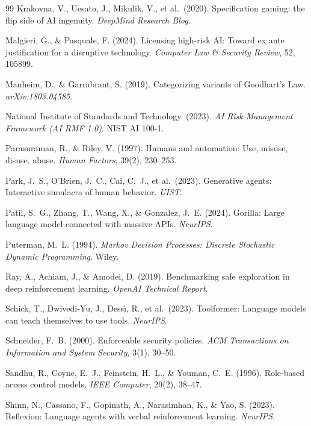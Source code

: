 \documentclass[11pt,a4paper]{article}
\theoremstyle{remark}
\begin{document}
\begin{thebibliography}{99}
Krakovna, V., Uesato, J., Mikulik, V., et al.\ (2020). Specification gaming: the flip side of AI ingenuity. \textit{DeepMind Research Blog}.

Malgieri, G., \& Pasquale, F. (2024). Licensing high-risk AI: Toward ex ante justification for a disruptive technology. \textit{Computer Law \& Security Review}, 52, 105899.

Manheim, D., \& Garrabrant, S. (2019). Categorizing variants of Goodhart's Law. \textit{arXiv:1803.04585}.

National Institute of Standards and Technology. (2023). \textit{AI Risk Management Framework (AI RMF 1.0)}. NIST AI 100-1.

Parasuraman, R., \& Riley, V. (1997). Humans and automation: Use, misuse, disuse, abuse. \textit{Human Factors}, 39(2), 230--253.

Park, J.~S., O'Brien, J.~C., Cai, C.~J., et al.\ (2023). Generative agents: Interactive simulacra of human behavior. \textit{UIST}.

Patil, S.~G., Zhang, T., Wang, X., \& Gonzalez, J.~E. (2024). Gorilla: Large language model connected with massive APIs. \textit{NeurIPS}.

Puterman, M.~L. (1994). \textit{Markov Decision Processes: Discrete Stochastic Dynamic Programming}. Wiley.

Ray, A., Achiam, J., \& Amodei, D. (2019). Benchmarking safe exploration in deep reinforcement learning. \textit{OpenAI Technical Report}.

Schick, T., Dwivedi-Yu, J., Dessì, R., et al.\ (2023). Toolformer: Language models can teach themselves to use tools. \textit{NeurIPS}.

Schneider, F.~B. (2000). Enforceable security policies. \textit{ACM Transactions on Information and System Security}, 3(1), 30--50.

Sandhu, R., Coyne, E.~J., Feinstein, H.~L., \& Youman, C.~E. (1996). Role-based access control models. \textit{IEEE Computer}, 29(2), 38--47.

Shinn, N., Cassano, F., Gopinath, A., Narasimhan, K., \& Yao, S. (2023). Reflexion: Language agents with verbal reinforcement learning. \textit{NeurIPS}.


\end{thebibliography}
\end{document}
